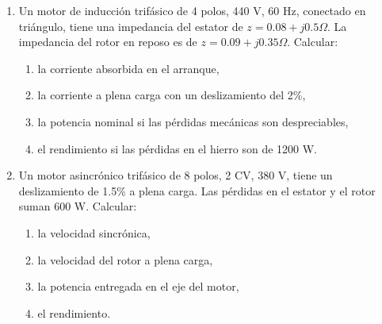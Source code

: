 \documentclass[../main]{subfiles}
\begin{document}
\begin{enumerate}
    \item Un motor de inducción trifásico de 4 polos, 440 V, 60 Hz, conectado en triángulo, tiene una impedancia del estator de $z = 0.08 + j0.5 \Omega$. La impedancia del rotor en reposo es de $z = 0.09 + j0.35 \Omega$. Calcular:
    \begin{enumerate}
        \item la corriente absorbida en el arranque,
        \item la corriente a plena carga con un deslizamiento del 2\%,
        \item la potencia nominal si las pérdidas mecánicas son despreciables,
        \item el rendimiento si las pérdidas en el hierro son de 1200 W.
    \end{enumerate}
    
    \item Un motor asincrónico trifásico de 8 polos, 2 CV, 380 V, tiene un deslizamiento de 1.5\% a plena carga. Las pérdidas en el estator y el rotor suman 600 W. Calcular:
    \begin{enumerate}
        \item la velocidad sincrónica,
        \item la velocidad del rotor a plena carga,
        \item la potencia entregada en el eje del motor,
        \item el rendimiento.
    \end{enumerate}
\end{enumerate}
\end{document}
